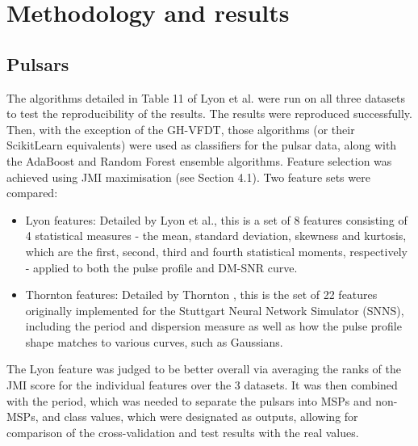 \documentclass[12pt]{article}
\begin{document}
\section{Methodology and results}
\subsection{Pulsars}
The algorithms detailed in Table 11 of Lyon et al. \cite{lyon2016fifty} were run on all three datasets to test the reproducibility of the results. The results were reproduced successfully. Then, with the exception of the GH-VFDT, those algorithms (or their ScikitLearn equivalents) were used as classifiers for the pulsar data, along with the AdaBoost and Random Forest ensemble algorithms. Feature selection was achieved using JMI maximisation (see Section 4.1). Two feature sets were compared:

\begin{itemize}
\item Lyon features: Detailed by Lyon et al.\cite{lyon2016fifty}, this is a set of 8 features consisting of 4 statistical measures - the mean, standard deviation, skewness and kurtosis, which are the first, second, third and fourth statistical moments, respectively - applied to both the pulse profile and DM-SNR curve.
\item Thornton features: Detailed by Thornton \cite{thornton2013high}, this is the set of 22 features originally implemented for the Stuttgart Neural Network Simulator (SNNS), including the period and dispersion measure as well as how the pulse profile shape matches to various curves, such as Gaussians.
\end{itemize}

The Lyon feature was judged to be better overall via averaging the ranks of the JMI score for the individual features over the 3 datasets. It was then combined with the period, which was needed to separate the pulsars into MSPs and non-MSPs, and class values, which were designated as outputs, allowing for comparison of the cross-validation and test results with the real values.
\end{document}
